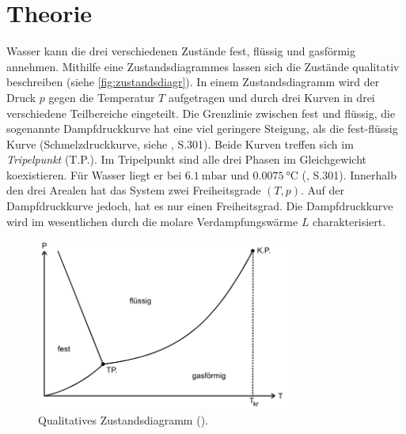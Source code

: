 \section{Theorie}
\label{sec:Theorie}
Wasser kann die drei verschiedenen Zustände fest, flüssig und gasförmig annehmen. Mithilfe eine Zustandsdiagrammes lassen sich die 
Zustände qualitativ beschreiben (siehe \autoref{fig:zustandsdiagr}). In einem Zustandsdiagramm wird der Druck $p$ gegen die Temperatur $T$ 
aufgetragen und durch drei Kurven in drei verschiedene Teilbereiche eingeteilt. Die Grenzlinie zwischen fest und flüssig, die sogenannte 
Dampfdruckkurve hat eine viel geringere Steigung, als die fest-flüssig Kurve (Schmelzdruckkurve, siehe \cite{gerthsen}, S.301). Beide Kurven
treffen sich im \textit{Tripelpunkt} (T.P.). Im Tripelpunkt sind alle drei Phasen im Gleichgewicht koexistieren. Für Wasser liegt er bei 
$\SI{6.1}{\milli\bar}$ und $\SI{0.0075}{\celsius}$ (\cite{gerthsen}, S.301).
Innerhalb den drei Arealen hat das System zwei Freiheitsgrade $(T,p)$. 
Auf der Dampfdruckkurve jedoch, hat es nur einen Freiheitsgrad.
Die Dampfdruckkurve wird im wesentlichen durch die molare Verdampfungswärme $L$ charakterisiert.

\begin{figure}[H]
    \centering
    \includegraphics[width=0.75\textwidth]{daten/Zustandsdiagramm.png}
    \caption{Qualitatives Zustandsdiagramm (\cite{anleitung}).}
    \label{fig:zustandsdiagr}
\end{figure}

